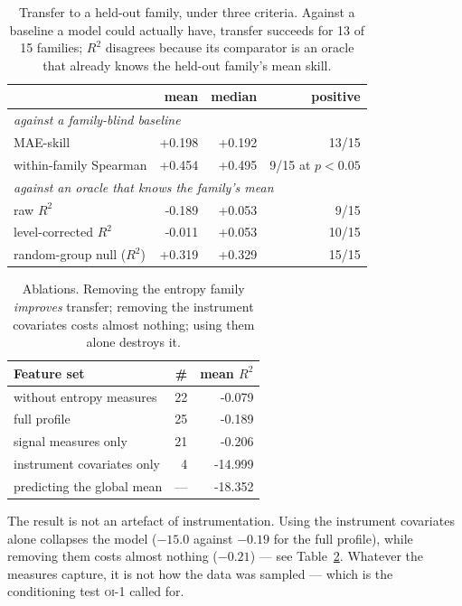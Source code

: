 \documentclass[11pt,a4paper]{article}
\newcommand{\num}[1]{#1}
\newcommand{\oi}[1]{\textsc{oi-#1}}
\begin{document}
\begin{table}[t]
\centering
\caption{Transfer to a held-out family, under three criteria. Against a
baseline a model could actually have, transfer succeeds for \num{13} of
\num{15} families; \(R^2\) disagrees because its comparator is an oracle that
already knows the held-out family's mean skill.}
\label{tab:transfer}
\small
\begin{tabular}{lrrr}
\toprule
 & mean & median & positive \\
\midrule
\multicolumn{4}{l}{\emph{against a family-blind baseline}}\\
MAE-skill                   & \num{+0.198} & \num{+0.192} & 13/15 \\
within-family Spearman      & \num{+0.454} & \num{+0.495} & 9/15 at \(p<0.05\) \\
\midrule
\multicolumn{4}{l}{\emph{against an oracle that knows the family's mean}}\\
raw \(R^2\)                 & \num{-0.189} & \num{+0.053} & 9/15 \\
level-corrected \(R^2\)     & \num{-0.011} & \num{+0.053} & 10/15 \\
\midrule
random-group null (\(R^2\)) & \num{+0.319} & \num{+0.329} & 15/15 \\
\bottomrule
\end{tabular}
\end{table}

\begin{table}[t]
\centering
\caption{Ablations. Removing the entropy family \emph{improves} transfer;
removing the instrument covariates costs almost nothing; using them alone
destroys it.}
\label{tab:ablation}
\small
\begin{tabular}{lrr}
\toprule
Feature set & \# & mean \(R^2\) \\
\midrule
without entropy measures   & 22 & \num{-0.079} \\
full profile               & 25 & \num{-0.189} \\
signal measures only       & 21 & \num{-0.206} \\
instrument covariates only & 4  & \num{-14.999} \\
\midrule
predicting the global mean & --- & \num{-18.352} \\
\bottomrule
\end{tabular}
\end{table}


The result is not an artefact of instrumentation. Using the instrument covariates
alone collapses the model (\(-15.0\) against \(-0.19\) for the full profile),
while removing them costs almost nothing (\(-0.21\)) --- see
Table~\ref{tab:ablation}. Whatever the
measures capture, it is not how the data was sampled --- which is the
conditioning test \oi{1} called for.
\end{document}
